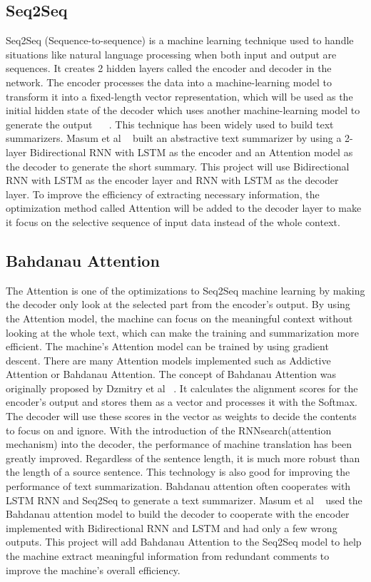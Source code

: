 \documentclass[conference]{IEEEtran}
\begin{document}
\subsection{Seq2Seq}
Seq2Seq (Sequence-to-sequence) is a machine learning technique used to handle situations like natural language processing when both input and output are sequences. It creates 2 hidden layers called the encoder and decoder in the network. The encoder processes the data into a machine-learning model to transform it into a fixed-length vector representation, which will be used as the initial hidden state of the decoder which uses another machine-learning model to generate the output ~\citep{sutskever2014sequence} ~\cite{vinyals2015show}. This technique has been widely used to build text summarizers. Masum et al ~\citep{Masum2019} built an abstractive text summarizer by using a 2-layer Bidirectional RNN with LSTM as the encoder and an Attention model as the decoder to generate the short summary. This project will use Bidirectional RNN with LSTM as the encoder layer and RNN with LSTM as the decoder layer. To improve the efficiency of extracting necessary information, the optimization method called Attention will be added to the decoder layer to make it focus on the selective sequence of input data instead of the whole context.
\subsection{Bahdanau Attention}
The Attention is one of the optimizations to Seq2Seq machine learning by making the decoder only look at the selected part from the encoder’s output. By using the Attention model, the machine can focus on the meaningful context without looking at the whole text, which can make the training and summarization more efficient. The machine’s Attention model can be trained by using gradient descent. There are many Attention models implemented such as Addictive Attention or Bahdanau Attention. The concept of Bahdanau Attention was originally proposed by Dzmitry et al ~\cite{bahdanau2014neural}. It calculates the alignment scores for the encoder’s output and stores them as a vector and processes it with the Softmax. The decoder will use these scores in the vector as weights to decide the contents to focus on and ignore. With the introduction of the RNNsearch(attention mechanism) into the decoder, the performance of machine translation has been greatly improved. Regardless of the sentence length, it is much more robust than the length of a source sentence. This technology is also good for improving the performance of text summarization. Bahdanau attention often cooperates with LSTM RNN and Seq2Seq to generate a text summarizer. Masum et al ~\citep{Masum2019} used the Bahdanau attention model to build the decoder to cooperate with the encoder implemented with Bidirectional RNN and LSTM and had only a few wrong outputs. This project will add Bahdanau Attention to the Seq2Seq model to help the machine extract meaningful information from redundant comments to improve the machine’s overall efficiency.
\end{document}

